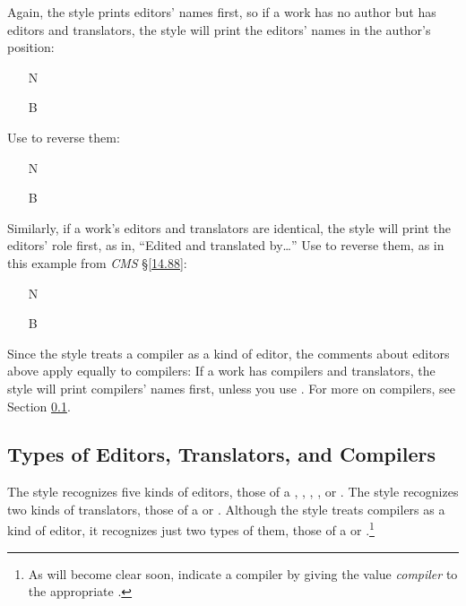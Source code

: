 \documentclass[11pt,letterpaper,oneside]{article}
\begin{document}
Again, the style prints editors' names first, so if a work has no
author but has editors and translators, the style will print the
editors' names in the author's position:

\begin{itemize}
\item[N] 

\item[B] 
\end{itemize}

\noindent Use  to reverse them:

\begin{itemize}
\item[N] 

\item[B] 
\end{itemize}

Similarly, if a work's editors and translators are identical, the
style will print the editors' role first, as in, ``Edited and
translated by\ldots'' Use  to reverse them, as in this
example from \textit{CMS} \S\ref{14.88}:

\begin{itemize}
\item[N] 

\item[B] 
\end{itemize}

Since the style treats a compiler as a kind of editor, the comments
about editors above apply equally to compilers: If a work has
compilers and translators, the style will print compilers' names
first, unless you use . For more on compilers, see
Section \ref{edtransnames}.

\subsection{Types of Editors, Translators, and Compilers}
\label{edtransnames}

The style recognizes five kinds of editors, those of a
, , ,
, or . The style recognizes two
kinds of translators, those of a  or
. Although the style treats compilers as a kind of
editor, it recognizes just two types of them, those of a
 or .\footnote{As will become
clear soon, indicate a compiler by giving the value \textit{compiler}
to the appropriate .}
\end{document}
